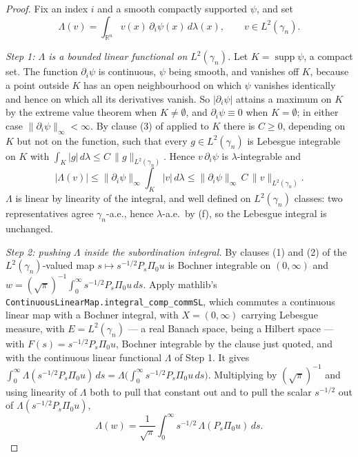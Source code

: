\begin{proof}
Fix an index $i$ and a smooth compactly supported $\psi$, and set
\[
  \Lambda(v) = \int_{\mathbb{R}^n} v(x)\,\partial_i\psi(x)\,d\lambda(x),
  \qquad v \in L^2(\gamma_n) .
\]

\emph{Step 1: $\Lambda$ is a bounded linear functional on $L^2(\gamma_n)$.}
Let $K = \operatorname{supp}\psi$, a compact set.  The function
$\partial_i\psi$ is continuous, $\psi$ being smooth, and vanishes off $K$,
because a point outside $K$ has an open neighbourhood on which $\psi$ vanishes
identically and hence on which all its derivatives vanish.  So
$|\partial_i\psi|$ attains a maximum on $K$ by the extreme value theorem when
$K \neq \emptyset$, and $\partial_i\psi \equiv 0$ when $K = \emptyset$; in either
case $\|\partial_i\psi\|_\infty < \infty$.  By clause (3) of
 applied to $K$ there is $C \geq 0$, depending
on $K$ but not on the function, such that every $g \in L^2(\gamma_n)$ is
Lebesgue integrable on $K$ with
$\int_K |g|\,d\lambda \leq C\,\|g\|_{L^2(\gamma_n)}$.  Hence
$v\,\partial_i\psi$ is $\lambda$-integrable and
\[
  |\Lambda(v)| \leq \|\partial_i\psi\|_\infty \int_K |v|\,d\lambda
    \leq \|\partial_i\psi\|_\infty\,C\,\|v\|_{L^2(\gamma_n)} .
\]
$\Lambda$ is linear by linearity of the integral, and well defined on
$L^2(\gamma_n)$ classes: two representatives agree $\gamma_n$-a.e., hence
$\lambda$-a.e.\ by (f), so the Lebesgue integral is unchanged.

\emph{Step 2: pushing $\Lambda$ inside the subordination integral.}
By clauses (1) and (2) of  the
$L^2(\gamma_n)$-valued map $s \mapsto s^{-1/2}P_s\Pi_0u$ is Bochner integrable on
$(0,\infty)$ and $w = (\sqrt\pi)^{-1}\int_0^\infty s^{-1/2}P_s\Pi_0u\,ds$.
Apply mathlib's \texttt{ContinuousLinearMap.integral\_comp\_commSL}, which
commutes a continuous linear map with a Bochner integral, with
$X = (0,\infty)$ carrying Lebesgue
measure, with $E = L^2(\gamma_n)$ --- a real Banach space, being a Hilbert space
--- with $F(s) = s^{-1/2}P_s\Pi_0u$, Bochner integrable by the clause just
quoted, and with the continuous linear functional $\Lambda$ of Step 1.  It gives
$\int_0^\infty \Lambda(s^{-1/2}P_s\Pi_0u)\,ds
  = \Lambda\bigl(\int_0^\infty s^{-1/2}P_s\Pi_0u\,ds\bigr)$.  Multiplying by
$(\sqrt\pi)^{-1}$ and using linearity of $\Lambda$ both to pull that constant out
and to pull the scalar $s^{-1/2}$ out of $\Lambda(s^{-1/2}P_s\Pi_0u)$,
\begin{equation*}
  \Lambda(w) = \frac{1}{\sqrt\pi}\int_0^\infty s^{-1/2}\,\Lambda(P_s\Pi_0u)\,ds .
  \tag{1}
\end{equation*}


\end{proof}
